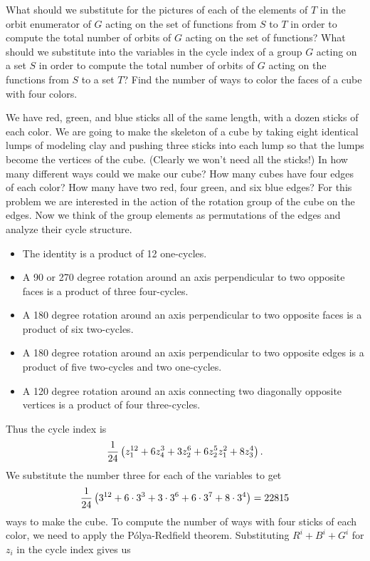 \itemei What should we substitute for the pictures of each of the elements of $T$ in
the orbit enumerator of $G$ acting on the set of functions from $S$ to $T$ in order to
compute the total number of orbits of $G$ acting on the set of functions?  What should we
substitute into the variables in the cycle index of a group $G$ acting on a set $S$ in
order to compute the total number of orbits of $G$ acting on the functions from $S$ to a
set $T$?
  Find the
number of ways to color the faces of a cube with four colors. 

\itemi  We have red, green, and blue sticks all of the same length, with a dozen
sticks of each color.  We are going to make the skeleton of a cube by taking eight
identical lumps of modeling clay and pushing three sticks into each lump so that the
lumps become the vertices of the cube.  (Clearly we won't need all the sticks!)  In
how many different ways could we make our cube?  How many cubes have four edges of
each color?  How many have two red, four green, and six blue
edges?\label{coloredsticks}
For this problem we are interested in the action of the rotation group of the
cube on the edges. Now we think of the group elements as permutations of the edges and
analyze their cycle structure.
\begin{itemize}
\item The identity is a product of 12 one-cycles.
\item A 90 or 270 degree rotation around an axis perpendicular to two opposite faces is a
product of three four-cycles.
\item A 180 degree rotation around an axis perpendicular to two opposite faces is a
product of six two-cycles.
\item A 180 degree rotation around an axis perpendicular to two opposite edges is a
product of five two-cycles and two one-cycles.
\item A 120 degree rotation around an axis connecting two diagonally opposite vertices is
a product of four three-cycles.
\end{itemize}
Thus the cycle index is 
$${1\over 24}\left(z_1^{12}+6z_4^3+3z_2^6+6z_2^5z_1^2 + 8z_3^4\right).$$  We substitute
the number three for each of the variables to get
$${1\over24}\left(3^{12}+6\cdot 3^3+3\cdot3^6+6\cdot 3^7 +8\cdot3^4\right)=22815$$ ways to
make the cube.  To compute the number of ways with four sticks of each color, we
need to apply the P\'olya-Redfield theorem.  Substituting $R^i+B^i+G^i$ for $z_i$ in
the cycle index gives us 

